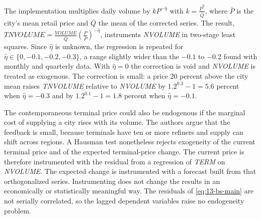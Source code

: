 The implementation multiplies daily volume by $kP^{-\hat\eta}$ with $k=\frac{\bar P^{\hat\eta}}{\bar Q}$,
where $\bar P$ is the city's mean retail price and $\bar Q$ the mean of the corrected series. The result,
$\textit{TNVOLUME}=\frac{\textit{VOLUME}}{\bar Q}\left(\frac{P}{\bar P}\right)^{-\hat\eta}$, instruments
\textit{NVOLUME} in two-stage least squares. Since $\hat\eta$ is unknown, the regression is repeated for
$\hat\eta\in\{0,-0.1,-0.2,-0.3\}$, a range slightly wider than the $-0.1$ to $-0.2$ found with monthly and
quarterly data. With $\hat\eta=0$ the correction is void and \textit{NVOLUME} is treated as exogenous. The
correction is small: a price 20 percent above the city mean raises \textit{TNVOLUME} relative to
\textit{NVOLUME} by $1.2^{0.3}-1=5.6$ percent when $\hat\eta=-0.3$ and by $1.2^{0.1}-1=1.8$ percent when
$\hat\eta=-0.1$.

The contemporaneous terminal price could also be endogenous if the marginal cost of supplying a city rises
with its volume. The authors argue that the feedback is small, because terminals have ten or more refiners
and supply can shift across regions. A Hausman test nonetheless rejects exogeneity of the current terminal
price and of the expected terminal-price change. The current price is therefore instrumented with the residual
from a regression of \textit{TERM} on \textit{NVOLUME}. The expected change is instrumented with a forecast built
from that orthogonalized series. Instrumenting does not change the results in an economically or statistically
meaningful way. The residuals of \eqref{eq:13-bs-main}
are not serially correlated, so the lagged dependent variables raise no endogeneity problem.

